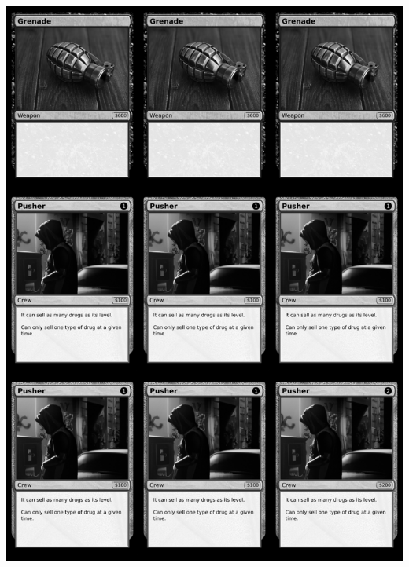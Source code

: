 \documentclass[a4paper]{article}
\begin{document}
\begin{center}
	\centering
	\includegraphics[width=190.5mm,height=266.7mm]{output/temp/page9.png}
\end{center}

\newpage
\end{document}
